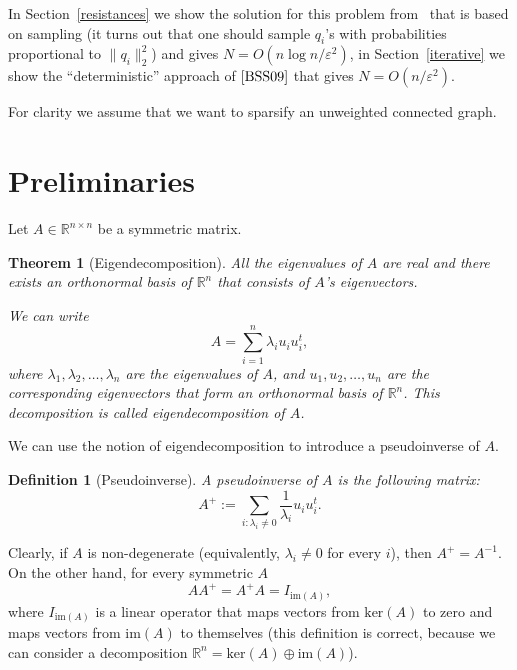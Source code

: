 \documentclass[12pt]{article}
\newcommand{\eps}{\varepsilon}
\newtheorem{theorem}{Theorem}
\newtheorem{definition}{Definition}
\begin{document}
    In Section~\ref{resistances} we show the solution for this problem from~\cite{SS11} that is based on sampling
    (it turns out that one should sample $q_i$'s with probabilities proportional to $\|q_i\|_2^2$)
    and gives $N = O(n \log n / \eps^2)$, in Section~\ref{iterative} we show the ``deterministic'' approach of
    $\cite{BSS09}$ that gives $N = O(n / \eps^2)$.

    For clarity we assume that we want to sparsify an unweighted connected graph.

    \section{Preliminaries}
    \label{linear_algebra}

    Let $A \in \mathbb{R}^{n \times n}$ be a symmetric matrix. 
    \begin{theorem}[Eigendecomposition]
        All the eigenvalues
        of $A$ are real and there exists an orthonormal basis of $\mathbb{R}^n$
        that consists of $A$'s eigenvectors.

        We can write
        $$
            A = \sum_{i=1}^n \lambda_i u_i u_i^t,
        $$
        where $\lambda_1, \lambda_2, \ldots, \lambda_n$ are the eigenvalues of $A$, and
        $u_1, u_2, \ldots, u_n$ are the corresponding eigenvectors that form an orthonormal
        basis of $\mathbb{R}^n$. This decomposition is called \emph{eigendecomposition}
        of $A$.
    \end{theorem}

    We can use the notion of eigendecomposition to introduce a pseudoinverse of $A$.

    \begin{definition}[Pseudoinverse]
        A \emph{pseudoinverse} of $A$ is the following matrix:
        $$
            A^+ := \sum_{i : \lambda_i \ne 0} \frac{1}{\lambda_i} u_i u_i^t.
        $$
    \end{definition}

    Clearly, if $A$ is non-degenerate (equivalently, $\lambda_i \ne 0$ for every $i$),
    then $A^+ = A^{-1}$.
    On the other hand, for every symmetric $A$
    $$
        A A^+ = A^+ A = I_{\mathrm{im}(A)},
    $$
    where $I_{\mathrm{im}(A)}$ is a linear operator that maps vectors from $\mathrm{ker}(A)$
    to zero and maps vectors from $\mathrm{im}(A)$ to themselves (this definition is correct,
    because we can consider a decomposition
    $\mathbb{R}^n = \mathrm{ker}(A) \oplus \mathrm{im}(A)$).
\end{document}
